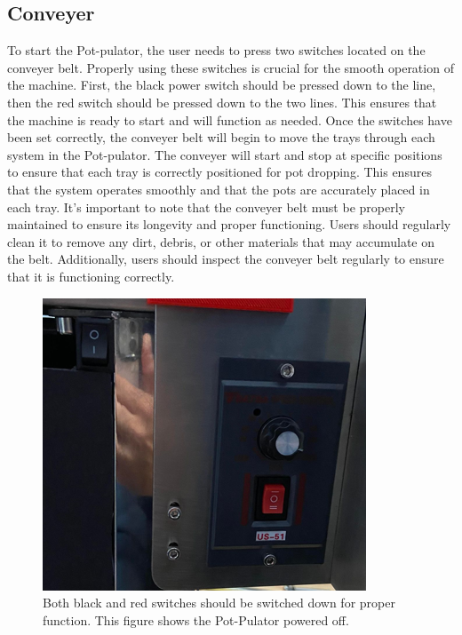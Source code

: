 \documentclass{article}
\begin{document}
\subsection{Conveyer}
To start the Pot-pulator, the user needs to press two switches located on the conveyer belt. Properly using these switches is crucial for the smooth operation of the machine. First, the black power switch should be pressed down to the line, then the red switch should be pressed down to the two lines. This ensures that the machine is ready to start and will function as needed.
Once the switches have been set correctly, the conveyer belt will begin to move the trays through each system in the Pot-pulator. The conveyer will start and stop at specific positions to ensure that each tray is correctly positioned for pot dropping. This ensures that the system operates smoothly and that the pots are accurately placed in each tray.
It's important to note that the conveyer belt must be properly maintained to ensure its longevity and proper functioning. Users should regularly clean it to remove any dirt, debris, or other materials that may accumulate on the belt. Additionally, users should inspect the conveyer belt regularly to ensure that it is functioning correctly.

\begin{figure}[H]
    \centering
    \includegraphics{switches.png}
    \caption{Both black and red switches should be switched down for proper function. This figure shows the Pot-Pulator powered off.}
    \label{fig:scope}
  \end{figure}
\newpage
\end{document}
